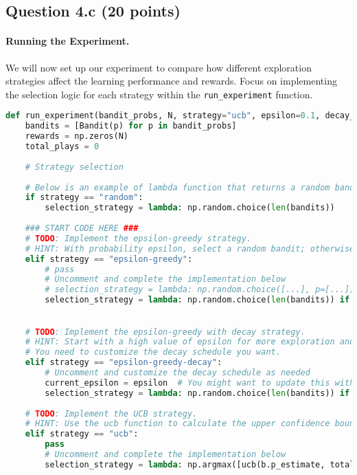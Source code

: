 \documentclass[12pt]{article}
\begin{document}
\subsection*{Question 4.c (20 points) } 
\paragraph{Running the Experiment.}
We will now set up our experiment to compare how different exploration strategies affect the learning performance and rewards. Focus on implementing the selection logic for each strategy within the \texttt{run\_experiment} function.
\begin{solution}
\begin{lstlisting}[language=Python]
def run_experiment(bandit_probs, N, strategy="ucb", epsilon=0.1, decay_rate=0.99):
    bandits = [Bandit(p) for p in bandit_probs]
    rewards = np.zeros(N)
    total_plays = 0
    
    # Strategy selection
    
    # Below is an example of lambda function that returns a random bandit, refer to this for the implementation of other strategies
    if strategy == "random":
        selection_strategy = lambda: np.random.choice(len(bandits))
    
    ### START CODE HERE ###
    # TODO: Implement the epsilon-greedy strategy.
    # HINT: With probability epsilon, select a random bandit; otherwise, select the bandit with the highest estimated win rate.
    elif strategy == "epsilon-greedy":
        # pass
        # Uncomment and complete the implementation below
        # selection_strategy = lambda: np.random.choice([...], p=[...])
        selection_strategy = lambda: np.random.choice(len(bandits)) if np.random.random() < epsilon else np.argmax([b.p_estimate for b in bandits])

    
    # TODO: Implement the epsilon-greedy with decay strategy.
    # HINT: Start with a high value of epsilon for more exploration and decrease it over time to shift towards exploitation.
    # You need to customize the decay schedule you want.
    elif strategy == "epsilon-greedy-decay":
        # Uncomment and customize the decay schedule as needed
        current_epsilon = epsilon  # You might want to update this within the loop
        selection_strategy = lambda: np.random.choice(len(bandits)) if np.random.random() < current_epsilon else np.argmax([b.p_estimate for b in bandits])
    
    # TODO: Implement the UCB strategy.
    # HINT: Use the ucb function to calculate the upper confidence bound for each bandit and select the bandit with the highest bound.
    elif strategy == "ucb":
        pass
        # Uncomment and complete the implementation below
        selection_strategy = lambda: np.argmax([ucb(b.p_estimate, total_plays, b.N) for b in bandits])
    

\end{lstlisting}
\end{solution}
\end{document}
